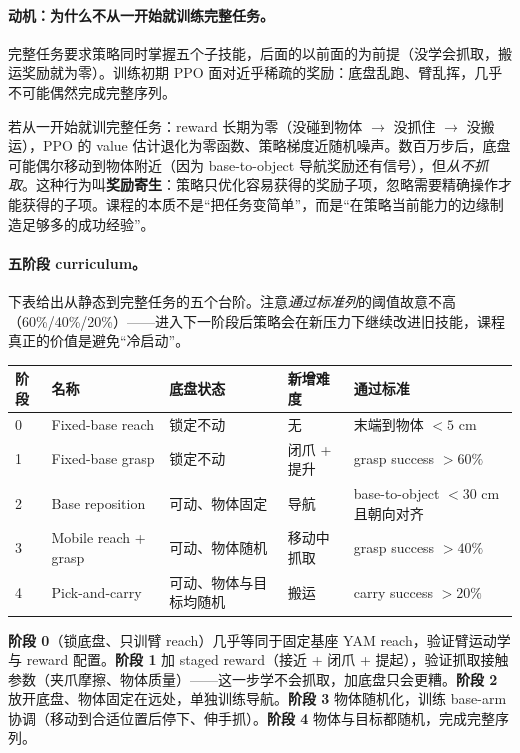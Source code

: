 \paragraph{动机：为什么不从一开始就训练完整任务。}完整任务要求策略同时掌握五个子技能，后面的以前面的为前提（没学会抓取，搬运奖励就为零）。训练初期 PPO 面对近乎稀疏的奖励：底盘乱跑、臂乱挥，几乎不可能偶然完成完整序列。

\begin{insight}\label{ins:rlmc-wh-parasite}
若从一开始就训完整任务：reward 长期为零（没碰到物体 $\to$ 没抓住 $\to$ 没搬运），PPO 的 value 估计退化为零函数、策略梯度近随机噪声。数百万步后，底盘可能偶尔移动到物体附近（因为 base-to-object 导航奖励还有信号），但\emph{从不抓取}。这种行为叫\textbf{奖励寄生}：策略只优化容易获得的奖励子项，忽略需要精确操作才能获得的子项。课程的本质不是“把任务变简单”，而是“在策略当前能力的边缘制造足够多的成功经验”。
\end{insight}

\paragraph{五阶段 curriculum。}下表给出从静态到完整任务的五个台阶。注意\emph{通过标准列}的阈值故意不高（60\%/40\%/20\%）——进入下一阶段后策略会在新压力下继续改进旧技能，课程真正的价值是避免“冷启动”。

\begin{center}
\small
\begin{tabular}{@{}llp{2.6cm}p{2.4cm}p{2.6cm}@{}}
\toprule
阶段 & 名称 & 底盘状态 & 新增难度 & 通过标准 \\
\midrule
0 & Fixed-base reach & 锁定不动 & 无 & 末端到物体 $<5$ cm \\
1 & Fixed-base grasp & 锁定不动 & 闭爪 + 提升 & grasp success $>60\%$ \\
2 & Base reposition & 可动、物体固定 & 导航 & base-to-object $<30$ cm 且朝向对齐 \\
3 & Mobile reach + grasp & 可动、物体随机 & 移动中抓取 & grasp success $>40\%$ \\
4 & Pick-and-carry & 可动、物体与目标均随机 & 搬运 & carry success $>20\%$ \\
\bottomrule
\end{tabular}
\end{center}

\textbf{阶段 0}（锁底盘、只训臂 reach）几乎等同于固定基座 YAM reach，验证臂运动学与 reward 配置。\textbf{阶段 1} 加 staged reward（接近 + 闭爪 + 提起），验证抓取接触参数（夹爪摩擦、物体质量）——这一步学不会抓取，加底盘只会更糟。\textbf{阶段 2} 放开底盘、物体固定在远处，单独训练导航。\textbf{阶段 3} 物体随机化，训练 base-arm 协调（移动到合适位置后停下、伸手抓）。\textbf{阶段 4} 物体与目标都随机，完成完整序列。


